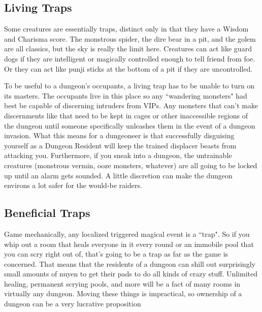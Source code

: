 \subsection{Living Traps}

Some creatures are essentially traps, distinct only in that they have a Wisdom and Charisma score. The monstrous spider, the dire bear in a pit, and the golem are all classics, but the sky is really the limit here. Creatures can act like guard dogs if they are intelligent or magically controlled enough to tell friend from foe. Or they can act like punji sticks at the bottom of a pit if they are uncontrolled.

To be useful to a dungeon's occupants, a living trap has to be unable to turn on its masters. The occupants live in this place so any ``wandering monsters" had best be capable of discerning intruders from VIPs. Any monsters that can't make discernments like that need to be kept in cages or other inaccessible regions of the dungeon until someone specifically unleashes them in the event of a dungeon invasion. What this means for a dungeoneer is that successfully disguising yourself as a Dungeon Resident will keep the trained displacer beasts from attacking you. Furthermore, if you sneak into a dungeon, the untrainable creatures (monstrous vermin, ooze monsters, whatever) are all going to be locked up until an alarm gets sounded. A little discretion can make the dungeon environs a lot safer for the would-be raiders.

\subsection{Beneficial Traps}

Game mechanically, any localized triggered magical event is a ``trap". So if you whip out a room that heals everyone in it every round or an immobile pool that you can scry right out of, that's going to be a trap as far as the game is concerned. That means that the residents of a dungeon can shill out surprisingly small amounts of nuyen to get their pads to do all kinds of crazy stuff. Unlimited healing, permanent scrying pools, and more will be a fact of many rooms in virtually any dungeon. Moving these things is impractical, so ownership of a dungeon can be a very lucrative proposition
